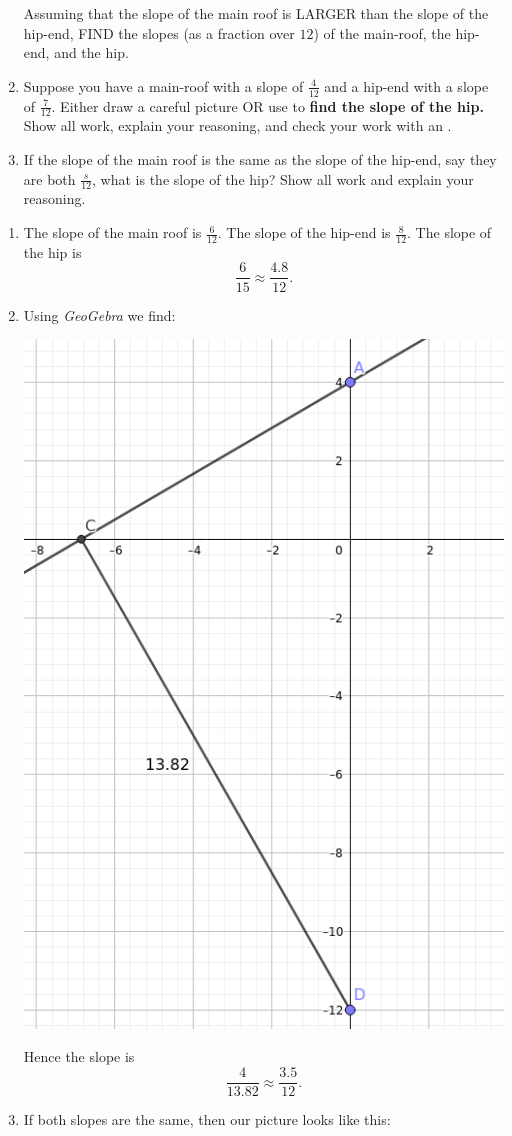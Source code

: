 \documentclass[hints,nooutcomes,noauthor,handout]{ximera}
\begin{document}
\begin{question}
\begin{enumerate}
\begin{center}
    \end{center}
    Assuming that the slope of the main roof is LARGER than the slope
    of the hip-end, FIND the slopes (as a fraction over $12$) of the main-roof, the hip-end, and
    the hip. 
  \item Suppose you have a main-roof with a slope of $\frac{4}{12}$
    and a hip-end with a slope of $\frac{7}{12}$. Either draw a
    careful picture OR use
     to
    \textbf{find the slope of the hip.}  Show all work, explain your
    reasoning, and check your work with an .
  \item If the slope of the main roof is the same as the slope of the
    hip-end, say they are both $\frac{s}{12}$, what is the slope of
    the hip? Show all work and explain your reasoning.
  \end{enumerate}
  \begin{freeResponse}
    \begin{enumerate}
    \item The slope of the main roof is $\frac{6}{12}$. The slope of
      the hip-end is $\frac{8}{12}$. The slope of the hip is
      \[
      \frac{6}{15} \approx \frac{4.8}{12}.
      \]
    \item Using \textit{GeoGebra} we find:
      \begin{center}
        \includegraphics[width=.3\textwidth]{workUnEqSlope.png}
      \end{center}
      Hence the slope is
      \[
      \frac{4}{13.82} \approx \frac{3.5}{12}.
      \]
    \item If both slopes are the same, then our picture looks like
      this:
      \begin{center}
        \begin{tikzpicture}[geometryDiagrams,scale=.2]


\end{tikzpicture}
\end{center}
\end{enumerate}
\end{freeResponse}
\end{question}
\end{document}
